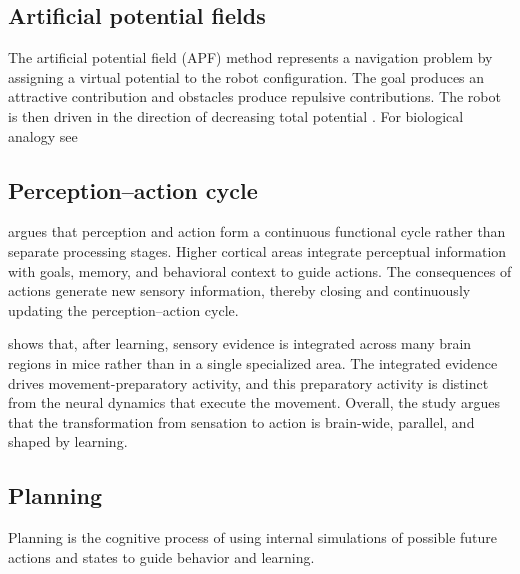 \documentclass[a4paper]{article}
\begin{document}
      \subsection{Artificial potential fields}
         The artificial potential field (APF) method represents a navigation problem by assigning a virtual potential to the robot configuration. The goal produces an attractive contribution and obstacles produce repulsive contributions. The robot is then driven in the direction of decreasing total potential \cite{khatib-1986-real-time-obstacle-avoidance}.
         For biological analogy see \cite{hu-2014-bacterial-navigation-gradients, kerr-2017-biological-goal-seeking}


      \subsection{Perception--action cycle}
         \cite{fuster-2004-upper-processing-stages-of-the-perception-action-cycle} argues that perception and action form a continuous functional cycle rather than separate processing stages. Higher cortical areas integrate perceptual information with goals, memory, and behavioral context to guide actions. The consequences of actions generate new sensory information, thereby closing and continuously updating the perception--action cycle.

         \cite{khilkevich-2024-brain-wide-dynamics-linking-sensation-to-action-during-decision-making}  shows that, after learning, sensory evidence is integrated across many brain regions in mice rather than in a single specialized area. The integrated evidence drives movement-preparatory activity, and this preparatory activity is distinct from the neural dynamics that execute the movement. Overall, the study argues that the transformation from sensation to action is brain-wide, parallel, and shaped by learning.
      \subsection{Planning}
         \cite{mattar-2026-planning-in-the-brain-its-not-what-you-think-it-is}
         Planning is the cognitive process of using internal simulations of possible future actions and states to guide behavior and learning.
\end{document}
